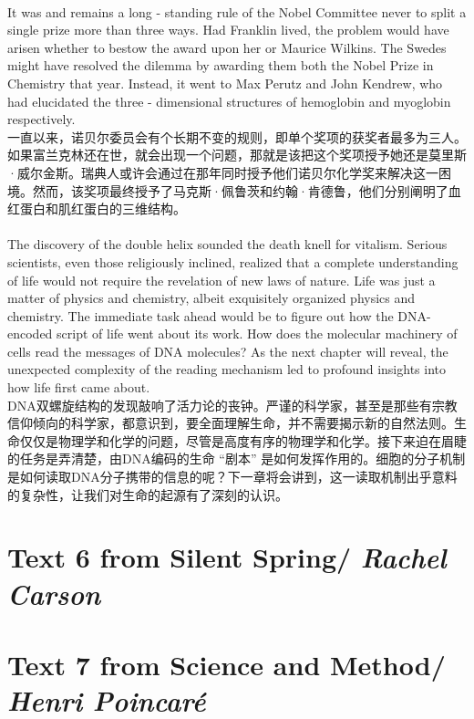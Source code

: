 \documentclass{article}
\begin{document}
\\
It was and remains a long - standing rule of the Nobel Committee never to split a single prize more than three ways. Had Franklin lived, the problem would have arisen whether to bestow the award upon her or Maurice Wilkins. The Swedes might have resolved the dilemma by awarding them both the Nobel Prize in Chemistry that year. Instead, it went to Max Perutz and John Kendrew, who had elucidated the three - dimensional structures of hemoglobin and myoglobin respectively.\\
一直以来，诺贝尔委员会有个长期不变的规则，即单个奖项的获奖者最多为三人。如果富兰克林还在世，就会出现一个问题，那就是该把这个奖项授予她还是莫里斯·威尔金斯。瑞典人或许会通过在那年同时授予他们诺贝尔化学奖来解决这一困境。然而，该奖项最终授予了马克斯·佩鲁茨和约翰·肯德鲁，他们分别阐明了血红蛋白和肌红蛋白的三维结构。 \\

\\
The discovery of the double helix sounded the death knell for vitalism. Serious scientists, even those religiously inclined, realized that a complete understanding of life would not require the revelation of new laws of nature. Life was just a matter of physics and chemistry, albeit exquisitely organized physics and chemistry. The immediate task ahead would be to figure out how the DNA-encoded script of life went about its work. How does the molecular machinery of cells read the messages of DNA molecules? As the next chapter will reveal, the unexpected complexity of the reading mechanism led to profound insights into how life first came about.\\
DNA双螺旋结构的发现敲响了活力论的丧钟。严谨的科学家，甚至是那些有宗教信仰倾向的科学家，都意识到，要全面理解生命，并不需要揭示新的自然法则。生命仅仅是物理学和化学的问题，尽管是高度有序的物理学和化学。接下来迫在眉睫的任务是弄清楚，由DNA编码的生命 “剧本” 是如何发挥作用的。细胞的分子机制是如何读取DNA分子携带的信息的呢？下一章将会讲到，这一读取机制出乎意料的复杂性，让我们对生命的起源有了深刻的认识。 \\

\newpage

\section{Text 6 from Silent Spring/ \textit{Rachel Carson}}
\newpage
\section{Text 7 from Science and Method/ \textit{Henri Poincaré}}
\newpage
\end{document}
